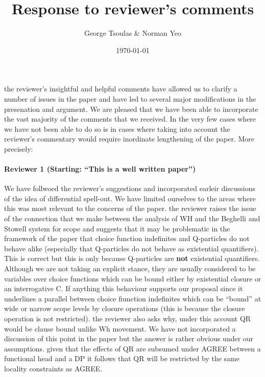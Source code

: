 \documentclass[11pt]{article}
\begin{document}
\title{Response to reviewer's comments}
\author{George Tsoulas \& Norman Yeo}
\date{\today}

\maketitle


the reviewer's insightful and helpful comments have allowed us to clarify a number of issues in the paper and have led to several major modifications in the presenation and argument.  We are pleased that we have been able to incorporate the vast majority of the comments that we received.  In the very few cases where we have not been able to do so is in cases where taking into account the reviewer's commentary would require inordinate lengthening of the paper.  More precisely:

\paragraph{Reviewer 1 (Starting: ``This is a well written paper'')}  We have follwoed the reviewer's suggestions and incorporated earleir discussions of the idea of differential spell-out.  We have limited ourselves to the areas where this was most relevant to the concerns of the paper.  the reviewer raises the issue of the connection that we make between the analysis of WH and the Beghelli and Stowell system for scope and suggests that it may be problematic in the framework of the paper that choice function  indefinites and Q-particles do not behave alike (especially that Q-particles do not behave as existential quantifiers).  This is correct but this is only because Q-particles are \textbf{not} existential quantifiers.  Although we are not taking an explicit stance, they are usually considered to be variables over choice functions which can be bound either by existential closure or an interrogative C.  If anything this behaviour supports our proposal since it underlines a parallel between choice fiunction indefinites which can be ``bound'' at wide or narrow scope levels by closure operations (this is because the closure operation is not restricted).
the reviewer also asks why, under this account QR would be clause bound unlike Wh movement.  We have not incorporated a discussion of this point in the paper but the answer is rather obvious under our assumptions.  given that the effects of QR are subsumed under AGREE between a functional head and a DP it follows that QR will be restricted by the same locality constraints as AGREE.
\end{document}
